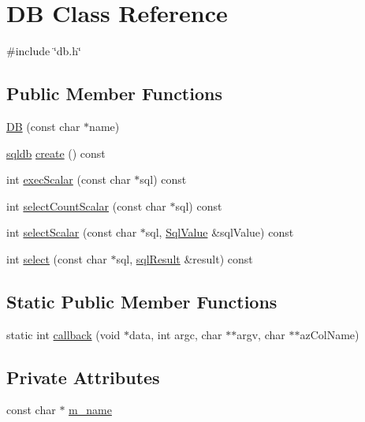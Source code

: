 \hypertarget{classDB}{}\section{DB Class Reference}
\label{classDB}


{\ttfamily \#include \char`\"{}db.\+h\char`\"{}}

\subsection*{Public Member Functions}
\begin{DoxyCompactItemize}
\item 
\mbox{\hyperlink{classDB_a1a7f3eafecf0e5834f03026c7f42e7ad}{DB}} (const char $\ast$name)
\item 
\mbox{\hyperlink{db_8h_a8c50929ef9b94683ef6653b885e5b9ed}{sqldb}} \mbox{\hyperlink{classDB_a669630d5015f0a02c649484feb228f57}{create}} () const
\item 
int \mbox{\hyperlink{classDB_aa81d5bd268236cb48a89717924c957d2}{exec\+Scalar}} (const char $\ast$sql) const
\item 
int \mbox{\hyperlink{classDB_a19e12469303264225f563b14c15bc2e6}{select\+Count\+Scalar}} (const char $\ast$sql) const
\item 
int \mbox{\hyperlink{classDB_a3b98437bd8c113a2bdd3a3bbbe499f85}{select\+Scalar}} (const char $\ast$sql, \mbox{\hyperlink{structSqlValue}{Sql\+Value}} \&sql\+Value) const
\item 
int \mbox{\hyperlink{classDB_a415cfd60411cfaaba4e88939a54e51eb}{select}} (const char $\ast$sql, \mbox{\hyperlink{db_8h_a356f4bbcc8528145c25584033ef0bcb8}{sql\+Result}} \&result) const
\end{DoxyCompactItemize}
\subsection*{Static Public Member Functions}
\begin{DoxyCompactItemize}
\item 
static int \mbox{\hyperlink{classDB_ac0dbe2bbb16c4519de0cc7754269abed}{callback}} (void $\ast$data, int argc, char $\ast$$\ast$argv, char $\ast$$\ast$az\+Col\+Name)
\end{DoxyCompactItemize}
\subsection*{Private Attributes}
\begin{DoxyCompactItemize}
\item 
const char $\ast$ \mbox{\hyperlink{classDB_a8ab4c5c7842069a778f6d4f14c15ed65}{m\+\_\+name}}
\end{DoxyCompactItemize}


